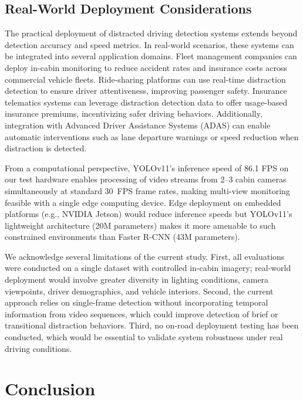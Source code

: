 \documentclass[conference]{IEEEtran}
\newcommand{\rev}[1]{{\color{blue}#1}} %
\begin{document}
\rev{\subsection{Real-World Deployment Considerations}

The practical deployment of distracted driving detection systems extends beyond detection accuracy and speed metrics. In real-world scenarios, these systems can be integrated into several application domains. Fleet management companies can deploy in-cabin monitoring to reduce accident rates and insurance costs across commercial vehicle fleets. Ride-sharing platforms can use real-time distraction detection to ensure driver attentiveness, improving passenger safety. Insurance telematics systems can leverage distraction detection data to offer usage-based insurance premiums, incentivizing safer driving behaviors. Additionally, integration with Advanced Driver Assistance Systems (ADAS) can enable automatic interventions such as lane departure warnings or speed reduction when distraction is detected.

From a computational perspective, YOLOv11's inference speed of 86.1 FPS on our test hardware enables processing of video streams from 2--3 cabin cameras simultaneously at standard 30~FPS frame rates, making multi-view monitoring feasible with a single edge computing device. Edge deployment on embedded platforms (e.g., NVIDIA Jetson) would reduce inference speeds but YOLOv11's lightweight architecture (20M parameters) makes it more amenable to such constrained environments than Faster R-CNN (43M parameters).

We acknowledge several limitations of the current study. First, all evaluations were conducted on a single dataset with controlled in-cabin imagery; real-world deployment would involve greater diversity in lighting conditions, camera viewpoints, driver demographics, and vehicle interiors. Second, the current approach relies on single-frame detection without incorporating temporal information from video sequences, which could improve detection of brief or transitional distraction behaviors. Third, no on-road deployment testing has been conducted, which would be essential to validate system robustness under real driving conditions.}

\section{Conclusion}
\label{sec:conclusion}

\end{document}
